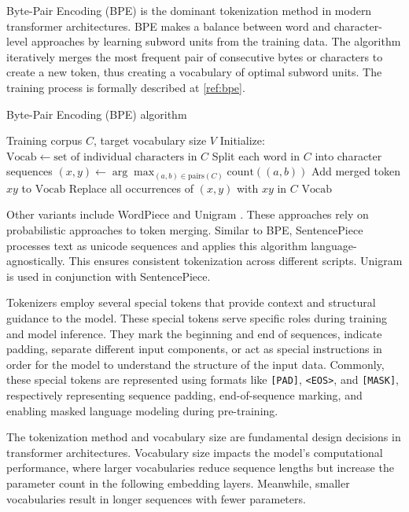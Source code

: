 Byte-Pair Encoding (BPE) \cite{bpe_sennrich-etal-2016-neural} is the dominant tokenization method in modern transformer architectures. BPE makes a balance between word and character-level approaches by learning subword units from the training data. The algorithm iteratively merges the most frequent pair of consecutive bytes or characters to create a new token, thus creating a vocabulary of optimal subword units. The training process is formally described at \ref{ref:bpe}.


\begin{algorithm}
\caption{Byte-Pair Encoding (BPE) algorithm}\label{ref:bpe}
\begin{algorithmic}[1]
\Require Training corpus $C$, target vocabulary size $V$
\State Initialize:
\State \quad $\text{Vocab} \gets \text{set of individual characters in } C$
\State \quad Split each word in $C$ into character sequences
    \State $(x, y) \gets \arg\max_{(a, b) \in \text{pairs}(C)} \text{count}((a, b))$
    \State Add merged token $xy$ to $\text{Vocab}$
    \State Replace all occurrences of $(x, y)$ with $xy$ in $C$
\EndWhile
\State \Return $\text{Vocab}$
\end{algorithmic}
\end{algorithm}

Other variants include WordPiece \cite{wordpiece} and Unigram \cite{unigram}. These approaches rely on probabilistic approaches to token merging. Similar to BPE, SentencePiece \cite{Kudo_2018} processes text as unicode sequences and applies this algorithm language-agnostically. This ensures consistent tokenization across different scripts. Unigram is used in conjunction with SentencePiece.

Tokenizers employ several special tokens that provide context and structural guidance to the model. These special tokens serve specific roles during training and model inference. They mark the beginning and end of sequences, indicate padding, separate different input components, or act as special instructions in order for the model to understand the structure of the input data. Commonly, these special tokens are represented using formats like \texttt{[PAD]}, \texttt{<EOS>}, and \texttt{[MASK]}, respectively representing sequence padding, end-of-sequence marking, and enabling masked language modeling during pre-training.

The tokenization method and vocabulary size are fundamental design decisions in transformer architectures. Vocabulary size impacts the model's computational performance, where larger vocabularies reduce sequence lengths but increase the parameter count in the following embedding layers. Meanwhile, smaller vocabularies result in longer sequences with fewer parameters.


